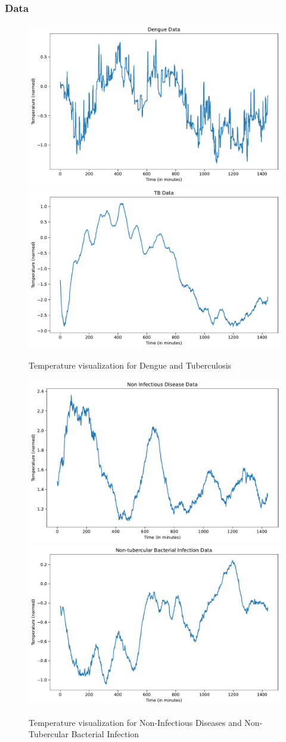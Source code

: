 \documentclass[pdf, 9pt]{beamer}
\begin{document}
	\begin{frame}
		\frametitle{Data}
		\begin{figure}
			\centering
			\includegraphics[width=0.4\linewidth]{figures/dengue_data.pdf}
			\includegraphics[width=0.4\linewidth]{figures/tb_data.pdf}
			\caption{Temperature visualization for Dengue and Tuberculosis}
		\end{figure}
		
		\begin{figure}
			\centering
			\includegraphics[width=0.4\linewidth]{figures/non_infectious_data.pdf}
			\includegraphics[width=0.4\linewidth]{figures/non_tubercular_data.pdf}
			\caption{Temperature visualization for Non-Infectious Diseases and Non-Tubercular Bacterial Infection}
		\end{figure}
	\end{frame}
	
\end{document}

